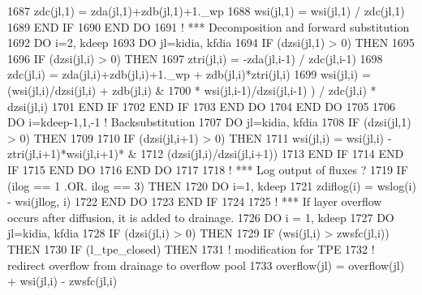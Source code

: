 \begin{DoxyCode}
1687       zdc(jl,1) = zda(jl,1)+zdb(jl,1)+1.\_wp
1688       wsi(jl,1) = wsi(jl,1) / zdc(jl,1)
1689 \textcolor{keywordflow}{    END IF}
1690 \textcolor{keywordflow}{  END DO}
1691 \textcolor{comment}{! *** Decomposition and forward substitution}
1692   \textcolor{keywordflow}{DO} i=2, kdeep
1693     \textcolor{keywordflow}{DO} jl=kidia, kfdia
1694       \textcolor{keywordflow}{IF} (dzsi(jl,1) > 0) \textcolor{keywordflow}{THEN}
1695 
1696         \textcolor{keywordflow}{IF} (dzsi(jl,i) > 0) \textcolor{keywordflow}{THEN}
1697           ztri(jl,i) = -zda(jl,i-1) / zdc(jl,i-1)
1698           zdc(jl,i) = zda(jl,i)+zdb(jl,i)+1.\_wp + zdb(jl,i)*ztri(jl,i)
1699           wsi(jl,i) = (wsi(jl,i)/dzsi(jl,i) + zdb(jl,i)  &
1700               * wsi(jl,i-1)/dzsi(jl,i-1) ) / zdc(jl,i) * dzsi(jl,i)
1701 \textcolor{keywordflow}{        END IF}
1702 \textcolor{keywordflow}{      END IF}
1703 \textcolor{keywordflow}{    END DO}
1704 \textcolor{keywordflow}{  END DO}
1705 
1706   \textcolor{keywordflow}{DO} i=kdeep-1,1,-1       \textcolor{comment}{! Backsubstitution}
1707     \textcolor{keywordflow}{DO} jl=kidia, kfdia
1708       \textcolor{keywordflow}{IF} (dzsi(jl,1) > 0) \textcolor{keywordflow}{THEN}
1709 
1710         \textcolor{keywordflow}{IF} (dzsi(jl,i+1) > 0) \textcolor{keywordflow}{THEN}
1711           wsi(jl,i) = wsi(jl,i) - ztri(jl,i+1)*wsi(jl,i+1)*  &
1712               (dzsi(jl,i)/dzsi(jl,i+1))
1713 \textcolor{keywordflow}{        END IF}
1714 \textcolor{keywordflow}{      END IF}
1715 \textcolor{keywordflow}{    END DO}
1716 \textcolor{keywordflow}{  END DO}
1717 
1718 \textcolor{comment}{! *** Log output of fluxes ?}
1719   \textcolor{keywordflow}{IF} (ilog == 1 .OR. ilog == 3) \textcolor{keywordflow}{THEN}
1720     \textcolor{keywordflow}{DO} i=1, kdeep
1721       zdiflog(i) = wslog(i) - wsi(jllog, i)
1722 \textcolor{keywordflow}{    END DO}
1723 \textcolor{keywordflow}{  END IF}
1724 
1725 \textcolor{comment}{! *** If layer overflow occurs after diffusion, it is added to drainage.}
1726   \textcolor{keywordflow}{DO} i = 1, kdeep
1727     \textcolor{keywordflow}{DO} jl=kidia, kfdia
1728       \textcolor{keywordflow}{IF} (dzsi(jl,i) > 0) \textcolor{keywordflow}{THEN}
1729         \textcolor{keywordflow}{IF} (wsi(jl,i) > zwsfc(jl,i)) \textcolor{keywordflow}{THEN}
1730           \textcolor{keywordflow}{IF} (l\_tpe\_closed) \textcolor{keywordflow}{THEN}
1731             \textcolor{comment}{! modification for TPE}
1732             \textcolor{comment}{! redirect overflow from drainage to overflow pool}
1733             overflow(jl) = overflow(jl) + wsi(jl,i) - zwsfc(jl,i)

\end{DoxyCode}
